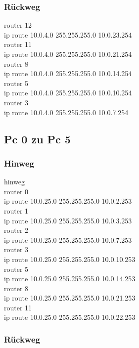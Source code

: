 \documentclass[a4paper]{article}
\begin{document}
\subsubsection{Rückweg}
router 12\\
ip route 10.0.4.0 255.255.255.0 10.0.23.254\\
router 11\\
ip route 10.0.4.0 255.255.255.0 10.0.21.254\\
router 8\\
ip route 10.0.4.0 255.255.255.0 10.0.14.254\\
router 5\\
ip route 10.0.4.0 255.255.255.0 10.0.10.254\\
router 3\\
ip route 10.0.4.0 255.255.255.0 10.0.7.254\\

\subsection{Pc 0 zu Pc 5}

\subsubsection{Hinweg}

hinweg\\
router 0\\
ip route 10.0.25.0 255.255.255.0 10.0.2.253\\
router 1\\
ip route 10.0.25.0 255.255.255.0 10.0.3.253\\
router 2\\
ip route 10.0.25.0 255.255.255.0 10.0.7.253\\
router 3\\
ip route 10.0.25.0 255.255.255.0 10.0.10.253\\
router 5\\
ip route 10.0.25.0 255.255.255.0 10.0.14.253\\
router 8\\
ip route 10.0.25.0 255.255.255.0 10.0.21.253\\
router 11\\
ip route 10.0.25.0 255.255.255.0 10.0.22.253\\
\newpage
\subsubsection{Rückweg}
\end{document}
